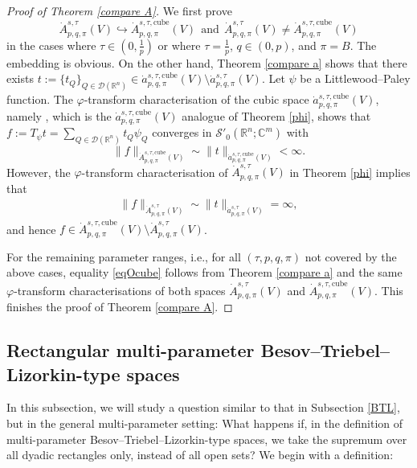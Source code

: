\documentclass[11pt, reqno]{amsart}
\theoremstyle{definition}
\theoremstyle{remark}
\numberwithin{equation}{section}
\begin{document}
\begin{proof}[Proof of Theorem \ref{compare A}]
We first prove
$$
\dot A^{s,\tau}_{p,q,\pi}(V)
\hookrightarrow
\dot A^{s,\tau,\mathrm{cube}}_{p,q,\pi}(V)
\ \ \text{and}\ \
\dot A^{s,\tau}_{p,q,\pi}(V)
\neq \dot A^{s,\tau,\mathrm{cube}}_{p,q,\pi}(V)
$$
in the cases where $\tau\in(0,\frac 1p)$ or where $\tau=\frac 1p$,
$q\in (0,p)$, and $\pi=B$.
The embedding is obvious.
On the other hand, Theorem \ref{compare a} shows that
there exists $t:=\{t_Q\}_{Q\in\mathscr D(\mathbb R^n)}\in\dot a^{s,\tau,\mathrm{cube}}_{p,q,\pi}(V) \setminus \dot a^{s,\tau}_{p,q,\pi}(V)$.
Let $\psi$ be a Littlewood--Paley function. The $\varphi$-transform characterisation of the cubic space $\dot a^{s,\tau,\mathrm{cube}}_{p,q,\pi}(V)$, namely \cite[Theorem 3.29]{BHYY:1a}, which is the $\dot a^{s,\tau,\mathrm{cube}}_{p,q,\pi}(V)$ analogue of Theorem \ref{phi},  shows that
$f:=T_\psi t=\sum_{Q\in\mathscr D(\mathbb R^n)} t_Q \psi_Q$ converges in $\mathscr S'_0(\mathbb R^n;\mathbb C^m)$ with
\begin{equation*}
   \|f\|_{\dot A^{s,\tau,\mathrm{cube}}_{p,q,\pi}(V)}
  \sim\|t\|_{\dot a^{s,\tau,\mathrm{cube}}_{p,q,\pi}(V)}
 <\infty.
\end{equation*}
However, the $\varphi$-transform characterisation of $\dot A^{s,\tau}_{p,q,\pi}(V)$ in Theorem \ref{phi}  implies that
\begin{align*}
\|f\|_{\dot A^{s,\tau}_{p,q,\pi}(V)}
\sim \|t\|_{\dot a^{s,\tau}_{p,q,\pi}(V)}
=\infty,
\end{align*}
and hence $f\in \dot A^{s,\tau,\mathrm{cube}}_{p,q,\pi}(V)\setminus \dot A^{s,\tau}_{p,q,\pi}(V)$.

For the remaining parameter ranges, i.e., for all
$(\tau,p,q,\pi)$ not covered by the above cases,
equality \eqref{eqOcube} follows from Theorem \ref{compare a} and
the same $\varphi$-transform characterisations of both spaces $\dot A^{s,\tau}_{p,q,\pi}(V)$
and $\dot A^{s,\tau,\mathrm{cube}}_{p,q,\pi}(V)$.
This finishes the proof of Theorem \ref{compare A}.
\end{proof}

\subsection{Rectangular multi-parameter Besov--Triebel--Lizorkin-type spaces} \label{BTL another}

In this subsection, we will study a question similar to that in Subsection \ref{BTL}, but in the general multi-parameter setting: What happens if, in the definition of multi-parameter Besov--Triebel--Lizorkin-type spaces, we take the supremum over all dyadic rectangles only, instead of all open sets?
We begin with a definition:
\end{document}

